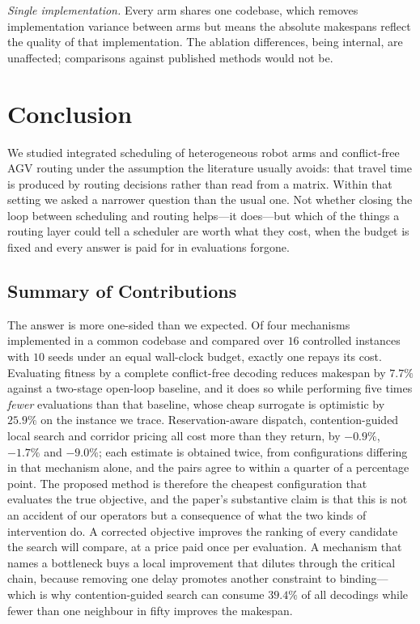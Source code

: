 \documentclass[manuscript,screen,review]{acmart}
\begin{document}
\emph{Single implementation.} Every arm shares one codebase, which removes
implementation variance between arms but means the absolute makespans reflect
the quality of that implementation. The ablation differences, being internal,
are unaffected; comparisons against published methods would not be.

\section{Conclusion}
\label{sec:Chapter_VI}

We studied integrated scheduling of heterogeneous robot arms and conflict-free
AGV routing under the assumption the literature usually avoids: that travel time
is produced by routing decisions rather than read from a matrix. Within that
setting we asked a narrower question than the usual one. Not whether closing the
loop between scheduling and routing helps---it does---but which of the things a
routing layer could tell a scheduler are worth what they cost, when the budget is
fixed and every answer is paid for in evaluations forgone.

\subsection{Summary of Contributions}
\label{sec:contributions}

The answer is more one-sided than we expected. Of four mechanisms implemented in a
common codebase and compared over $16$ controlled instances with $10$ seeds under
an equal wall-clock budget, exactly one repays its cost. Evaluating fitness by a
complete conflict-free decoding reduces makespan by $7.7\%$ against a two-stage
open-loop baseline, and it does so while performing five times \emph{fewer}
evaluations than that baseline, whose cheap surrogate is optimistic by $25.9\%$ on
the instance we trace. Reservation-aware dispatch, contention-guided local search
and corridor pricing all cost more than they return, by $-0.9\%$, $-1.7\%$ and
$-9.0\%$; each estimate is obtained twice, from configurations differing in that
mechanism alone, and the pairs agree to within a quarter of a percentage point.
The proposed method is therefore the cheapest configuration that evaluates the
true objective, and the paper's substantive claim is that this is not an accident
of our operators but a consequence of what the two kinds of intervention do. A
corrected objective improves the ranking of every candidate the search will
compare, at a price paid once per evaluation. A mechanism that names a bottleneck
buys a local improvement that dilutes through the critical chain, because removing
one delay promotes another constraint to binding---which is why contention-guided
search can consume $39.4\%$ of all decodings while fewer than one neighbour in
fifty improves the makespan.
\end{document}
